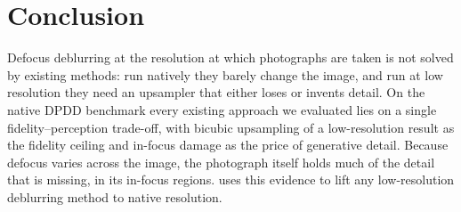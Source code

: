 \section{Conclusion}
\label{sec:conclusion}
Defocus deblurring at the resolution at which photographs are taken is not solved by existing methods:
run natively they barely change the image, and run at low resolution they need an upsampler that either
loses or invents detail. On the native DPDD benchmark every existing approach we evaluated lies on a
single fidelity--perception trade-off, with bicubic upsampling of a low-resolution result as the
fidelity ceiling and in-focus damage as the price of generative detail. Because defocus varies across the image, the photograph itself holds much of
the detail that is missing, in its in-focus regions. \method uses this evidence to lift any
low-resolution deblurring method to native resolution. 

